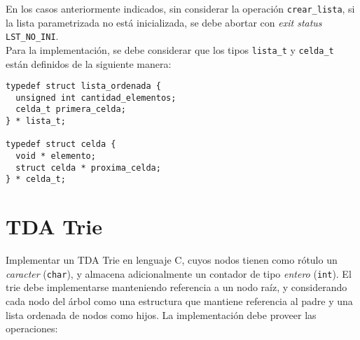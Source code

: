 \documentclass[12pt,a4paper]{article}
\begin{document}
En los casos anteriormente indicados, sin considerar la operación \texttt{crear\_lista}, si la lista parametrizada no está inicializada, se debe abortar con \emph{exit status} \texttt{LST\_NO\_INI}. \\

Para la implementación, se debe considerar que los tipos \texttt{lista\_t} y \texttt{celda\_t} están definidos de la siguiente manera:

\begin{verbatim}
typedef struct lista_ordenada {
  unsigned int cantidad_elementos;
  celda_t primera_celda;
} * lista_t;

typedef struct celda {
  void * elemento;
  struct celda * proxima_celda;
} * celda_t;
\end{verbatim}

\section{TDA Trie}

Implementar un TDA Trie en lenguaje C, cuyos nodos tienen como rótulo un \emph{caracter} (\texttt{char}), y almacena adicionalmente un contador de tipo \emph{entero} (\texttt{int}). El trie debe implementarse manteniendo referencia a un nodo raíz, y considerando cada nodo del árbol como una estructura que mantiene referencia al padre y una lista ordenada de nodos como hijos. La implementación debe proveer las operaciones:
\end{document}
